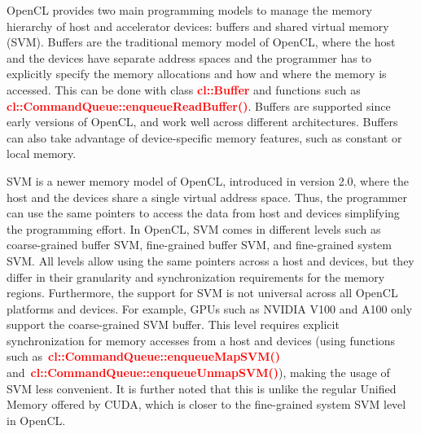





\par
OpenCL provides two main programming models to manage the memory hierarchy of host and accelerator devices: buffers and shared virtual memory (SVM).
Buffers are the traditional memory model of OpenCL, where the host and the devices have separate address spaces and the programmer has to explicitly specify the memory allocations and how and where the memory is accessed. This can be done with class \textbf{\textcolor{red}{cl::Buffer}} and functions such as \textbf{\textcolor{red}{cl::CommandQueue::enqueueReadBuffer()}}.
Buffers are supported since early versions of OpenCL, and work well across different architectures.
Buffers can also take advantage of device-specific memory features, such as constant or local memory.


\par
SVM is a newer memory model of OpenCL, introduced in version 2.0, where the host and the devices share a single virtual address space.
Thus, the programmer can use the same pointers to access the data from host and devices simplifying the programming effort.
In OpenCL, SVM comes in different levels such as coarse-grained buffer SVM, fine-grained buffer SVM, and fine-grained system SVM.
All levels allow using the same pointers across a host and devices, but they differ in their granularity and synchronization requirements for the memory regions.
Furthermore, the support for SVM is not universal across all OpenCL platforms and devices.
For example, GPUs such as NVIDIA V100 and A100 only support the coarse-grained SVM buffer.
This level requires explicit synchronization for memory accesses from a host and devices (using functions such as~\textbf{\textcolor{red}{cl::CommandQueue::enqueueMapSVM()}} and~\textbf{\textcolor{red}{cl::CommandQueue::enqueueUnmapSVM()}}), making the usage of SVM less convenient.
It is further noted that this is unlike the regular Unified Memory offered by CUDA, which is closer to the fine-grained system SVM level in OpenCL.


